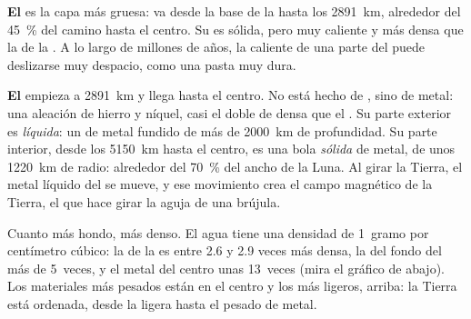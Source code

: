 \textbf{El } es la capa más gruesa: va desde la base de la 
hasta los 2891~km, alrededor del 45~\% del camino hasta el centro. Su 
es sólida, pero muy caliente y más densa que la  de la . A lo
largo de millones de años, la  caliente de una parte del  puede
deslizarse muy despacio, como una pasta muy dura.

\textbf{El } empieza a 2891~km y llega hasta el centro. No está hecho
de , sino de metal: una aleación de hierro y níquel, casi el doble de
densa que el . Su parte exterior es \emph{líquida}: un  de metal
fundido de más de 2000~km de profundidad. Su parte interior, desde los
5150~km hasta el centro, es una bola \emph{sólida} de metal, de unos 1220~km de radio: alrededor del 70~\% del ancho de la Luna. Al girar la Tierra, el metal líquido del
 se mueve, y ese movimiento crea el campo magnético de la
Tierra, el que hace girar la aguja de una brújula.

Cuanto más hondo, más denso. El agua tiene una densidad de 1~gramo por
centímetro cúbico: la  de la  es entre 2.6 y 2.9 veces más
densa, la  del fondo del  más de 5~veces, y el metal del centro
unas 13~veces (mira el gráfico de abajo). Los materiales más pesados están en el centro y los más ligeros, arriba: la Tierra está ordenada, desde la  ligera hasta el pesado  de metal.


